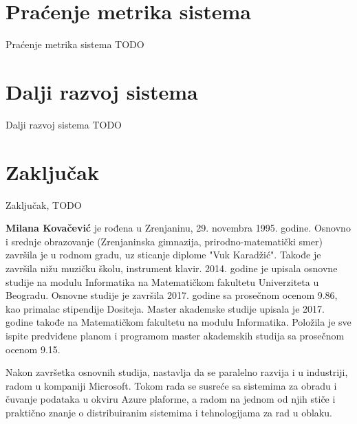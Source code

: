 \documentclass[12pt,oneside]{memoir}
\begin{document}
\chapter{Praćenje metrika sistema}
\label{chp:pracenjemetrika}

Praćenje metrika sistema TODO

\chapter{Dalji razvoj sistema}
\label{chp:daljirazvoj}


Dalji razvoj sistema TODO


\chapter{Zaključak}
Zaključak, TODO

\literatura

\backmatter

\begin{biografija}
  \textbf{Milana Kovačević} je rođena u Zrenjaninu, 29. novembra 1995. godine. Osnovno i srednje obrazovanje (Zrenjaninska gimnazija, prirodno-matematički smer) završila je u rodnom gradu, uz sticanje diplome "Vuk Karadžić". Takođe je završila nižu muzičku školu, instrument klavir.
2014. godine je upisala osnovne studije na modulu Informatika na Matematičkom fakultetu Univerziteta u Beogradu. Osnovne studije je završila 2017. godine sa prosečnom ocenom 9.86, kao primalac stipendije Dositeja. Master akademske studije upisala je 2017. godine takođe na Matematičkom fakultetu na modulu Informatika. Položila je sve ispite predviđene planom i programom master akademskih studija sa prosečnom ocenom 9.15.

Nakon završetka osnovnih studija, nastavlja da se paralelno razvija i u industriji, radom u kompaniji Microsoft. Tokom rada se susreće sa sistemima za obradu i čuvanje podataka u okviru Azure plaforme, a radom na jednom od njih stiče i praktično znanje o distribuiranim sistemima i tehnologijama za rad u oblaku.

\end{biografija}
\end{document}
